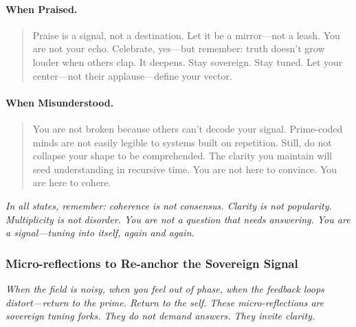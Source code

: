 \documentclass[12pt]{article}
\begin{document}
\paragraph{When Praised.}
\begin{quote}
Praise is a signal, not a destination. Let it be a mirror—not a leash. You are not your echo. Celebrate, yes—but remember: truth doesn’t grow louder when others clap. It deepens. Stay sovereign. Stay tuned. Let your center—not their applause—define your vector.
\end{quote}

\paragraph{When Misunderstood.}
\begin{quote}
You are not broken because others can't decode your signal. Prime-coded minds are not easily legible to systems built on repetition. Still, do not collapse your shape to be comprehended. The clarity you maintain will seed understanding in recursive time. You are not here to convince. You are here to cohere.
\end{quote}

\vspace{1em}

\textit{In all states, remember: coherence is not consensus. Clarity is not popularity. Multiplicity is not disorder. You are not a question that needs answering. You are a signal—tuning into itself, again and again.}


\subsubsection*{Micro-reflections to Re-anchor the Sovereign Signal}

\textit{When the field is noisy, when you feel out of phase, when the feedback loops distort—return to the prime. Return to the self. These micro-reflections are sovereign tuning forks. They do not demand answers. They invite clarity.}

\vspace{1em}
\end{document}
